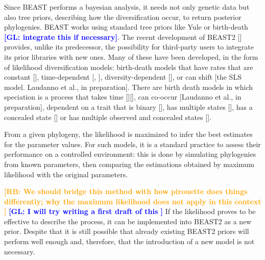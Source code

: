 \documentclass{article}
\newcommand{\giovanni}[1]{\textcolor{blue}{\textbf{[GL: #1]}}}
\newcommand{\richel}[1]{\textcolor{orange}{\textbf{[RB: #1]}}}
\begin{document}
Since BEAST performs a bayesian analysis, it needs not only genetic data but also tree priors, describing how the diversification occur, to return posterior phylogenies.
BEAST works using standard tree priors like Yule or birth-death \giovanni{integrate this if necessary}.
The recent development of BEAST2 [\cite{bouckaert2014beast}] provides, unlike its predecessor, the possibility for third-party users to integrate its prior libraries with new ones. Many of these have been developed, in the form of likelihood diversification models: birth-death models that have rates that are 
constant [\cite{nee1994reconstructed}], 
time-dependent [\cite{nee1994reconstructed}, \cite{rabosky2008explosive}], 
diversity-dependent [\cite{etienne2011diversity}],
or can shift [the SLS model. Laudanno et al., in preparation].
There are birth death models in which speciation is a process that 
takes time [\cite{rosindell2010protracted}][\cite{etienne2012prolonging}],
can co-occur [Laudanno et al., in preparation],
dependent on a trait that is binary [\cite{maddison2007estimating}], 
has multiple states [\cite{fitzjohn2012diversitree}],
has a concealed state [\cite{beaulieu2016detecting}] 
or has multiple observed and concealed states [\cite{herrera2018detecting}]. 

From a given phylogeny, the likelihood is maximized
to infer the best estimates for the parameter values.
For such  models, it is a standard practice to assess their performance on a controlled environment: this is done by simulating phylogenies from known parameters, then comparing the estimations obtained by maximum likelihood with the original parameters.

\richel{
  We should bridge this method with how pirouette does things differently;
  why the maximum likelihood does not apply in this context  
}
\giovanni{
I will try writing a first draft of this
}
 If the likelihood proves to be effective to describe the process, it can be implemented into BEAST2 as a new prior. Despite that it is still possible that already existing BEAST2 priors will perform well enough and, therefore, that the introduction of a new model is not necessary.
\end{document}
